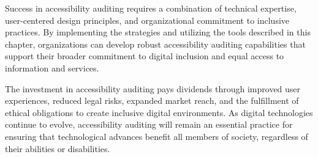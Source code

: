 Success in accessibility auditing requires a combination of technical expertise, user-centered design principles, and organizational commitment to inclusive practices. By implementing the strategies and utilizing the tools described in this chapter, organizations can develop robust accessibility auditing capabilities that support their broader commitment to digital inclusion and equal access to information and services.

The investment in accessibility auditing pays dividends through improved user experiences, reduced legal risks, expanded market reach, and the fulfillment of ethical obligations to create inclusive digital environments. As digital technologies continue to evolve, accessibility auditing will remain an essential practice for ensuring that technological advances benefit all members of society, regardless of their abilities or disabilities.
